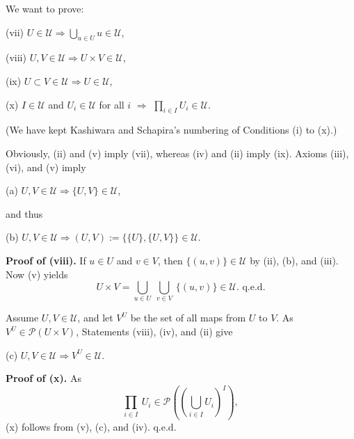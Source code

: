 \documentclass[12pt]{article}
\theoremstyle{remark}
\theoremstyle{definition}
\newcommand{\then}{\Rightarrow}
\begin{document}
\noindent We want to prove:

(vii) $U\in\mathcal U\then\bigcup_{u\in U}u\in\mathcal U$,

(viii) $U,V\in\mathcal U\then U\times V\in\mathcal U$,

(ix) $U\subset V\in\mathcal U\then U\in\mathcal U$,

(x) $I\in \mathcal U$ and $U_i\in\mathcal U$ for all $i$ $\then$ $\prod_{i\in I}U_i\in\mathcal U$.

\noindent(We have kept Kashiwara and Schapira's numbering of Conditions (i) to (x).) 

\noindent Obviously, (ii) and (v) imply (vii), whereas (iv) and (ii) imply (ix). Axioms (iii), (vi), and (v) imply

(a) $U,V\in\mathcal U\then\{U,V\}\in\mathcal U$,

\noindent and thus

(b) $U,V\in\mathcal U\then(U,V):=\{\{U\},\{U,V\}\}\in\mathcal U$.

\noindent\textbf{Proof of (viii).} If $u\in U$ and $v\in V$, then $\{(u,v)\}\in\mathcal U$ by (ii), (b), and (iii). Now (v) yields 
$$
U\times V=\bigcup_{u\in U}\ \bigcup_{v\in V}\ \{(u,v)\}\in\mathcal U.\text{ q.e.d.} 
$$ 

Assume $U,V\in\mathcal U$, and let $V^U$ be the set of all maps from $U$ to $V$. As $V^U\in\mathcal P(U\times V)$, Statements (viii), (iv), and (ii) give

(c) $U,V\in\mathcal U\then V^U\in\mathcal U$.

\noindent\textbf{Proof of (x).} As 
$$
\prod_{i\in I}\ U_i\in\mathcal P\left(\left(\bigcup_{i\in I}U_i\right)^I\right),
$$
(x) follows from (v), (c), and (iv). q.e.d.
%
%
\end{document}
